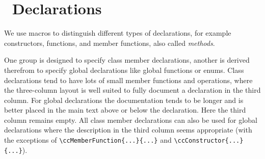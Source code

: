 \documentclass[11pt]{article}
\begin{document}
\section{\CC\ Declarations}
\label{sectionDeclarations}
 

We use macros to distinguish different types of declarations, for
example constructors, functions, and member functions, also called
{\em methods}.

One group is designed to specify class member declarations, another is
derived therefrom to specify global declarations like global functions
or enums. Class declarations tend to have lots of small member
functions and operations, where the three-column layout is well suited
to fully document a declaration in the third column. For global
declarations the documentation tends to be longer and is better placed
in the main text above or below the declaration. Here the third column
remains empty. All class member declarations can also be used for
global declarations where the description in the third column seems
appropriate (with the exceptions of
\verb+\ccMemberFunction{...}{...}+ and \verb+\ccConstructor{...}{...}+).
\end{document}
